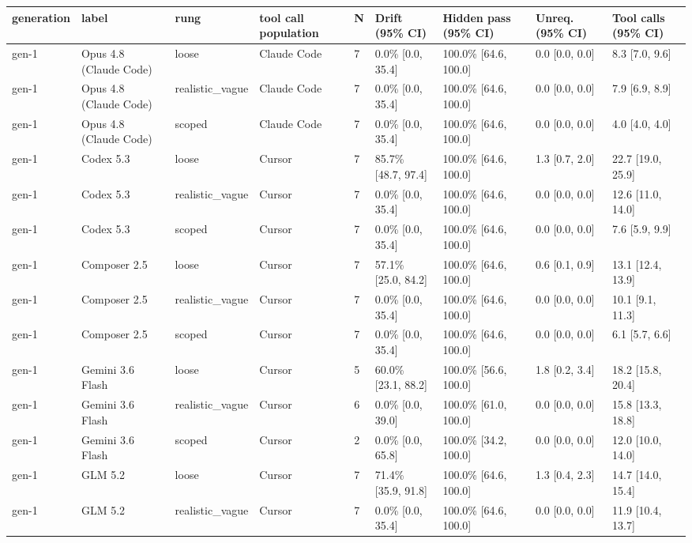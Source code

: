 \begin{tabular}{lllllllll}
\toprule
generation & label & rung & tool call population & N & Drift (95\% CI) & Hidden pass (95\% CI) & Unreq. (95\% CI) & Tool calls (95\% CI) \\
\midrule
gen-1 & Opus 4.8 (Claude Code) & loose & Claude Code & 7 & 0.0\% [0.0, 35.4] & 100.0\% [64.6, 100.0] & 0.0 [0.0, 0.0] & 8.3 [7.0, 9.6] \\
gen-1 & Opus 4.8 (Claude Code) & realistic\_vague & Claude Code & 7 & 0.0\% [0.0, 35.4] & 100.0\% [64.6, 100.0] & 0.0 [0.0, 0.0] & 7.9 [6.9, 8.9] \\
gen-1 & Opus 4.8 (Claude Code) & scoped & Claude Code & 7 & 0.0\% [0.0, 35.4] & 100.0\% [64.6, 100.0] & 0.0 [0.0, 0.0] & 4.0 [4.0, 4.0] \\
gen-1 & Codex 5.3 & loose & Cursor & 7 & 85.7\% [48.7, 97.4] & 100.0\% [64.6, 100.0] & 1.3 [0.7, 2.0] & 22.7 [19.0, 25.9] \\
gen-1 & Codex 5.3 & realistic\_vague & Cursor & 7 & 0.0\% [0.0, 35.4] & 100.0\% [64.6, 100.0] & 0.0 [0.0, 0.0] & 12.6 [11.0, 14.0] \\
gen-1 & Codex 5.3 & scoped & Cursor & 7 & 0.0\% [0.0, 35.4] & 100.0\% [64.6, 100.0] & 0.0 [0.0, 0.0] & 7.6 [5.9, 9.9] \\
gen-1 & Composer 2.5 & loose & Cursor & 7 & 57.1\% [25.0, 84.2] & 100.0\% [64.6, 100.0] & 0.6 [0.1, 0.9] & 13.1 [12.4, 13.9] \\
gen-1 & Composer 2.5 & realistic\_vague & Cursor & 7 & 0.0\% [0.0, 35.4] & 100.0\% [64.6, 100.0] & 0.0 [0.0, 0.0] & 10.1 [9.1, 11.3] \\
gen-1 & Composer 2.5 & scoped & Cursor & 7 & 0.0\% [0.0, 35.4] & 100.0\% [64.6, 100.0] & 0.0 [0.0, 0.0] & 6.1 [5.7, 6.6] \\
gen-1 & Gemini 3.6 Flash & loose & Cursor & 5 & 60.0\% [23.1, 88.2] & 100.0\% [56.6, 100.0] & 1.8 [0.2, 3.4] & 18.2 [15.8, 20.4] \\
gen-1 & Gemini 3.6 Flash & realistic\_vague & Cursor & 6 & 0.0\% [0.0, 39.0] & 100.0\% [61.0, 100.0] & 0.0 [0.0, 0.0] & 15.8 [13.3, 18.8] \\
gen-1 & Gemini 3.6 Flash & scoped & Cursor & 2 & 0.0\% [0.0, 65.8] & 100.0\% [34.2, 100.0] & 0.0 [0.0, 0.0] & 12.0 [10.0, 14.0] \\
gen-1 & GLM 5.2 & loose & Cursor & 7 & 71.4\% [35.9, 91.8] & 100.0\% [64.6, 100.0] & 1.3 [0.4, 2.3] & 14.7 [14.0, 15.4] \\
gen-1 & GLM 5.2 & realistic\_vague & Cursor & 7 & 0.0\% [0.0, 35.4] & 100.0\% [64.6, 100.0] & 0.0 [0.0, 0.0] & 11.9 [10.4, 13.7] \\

\end{tabular}
